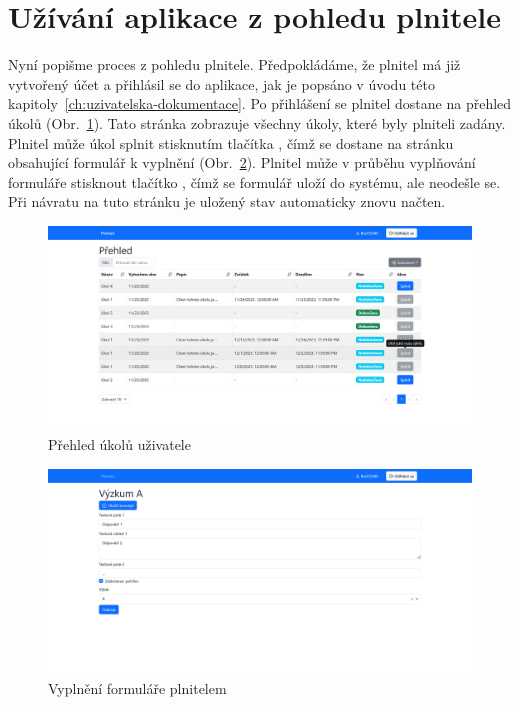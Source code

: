 \section{Užívání aplikace z pohledu plnitele}\label{sec:uzivani-aplikace-z-pohledu-plnitele}

Nyní popišme proces z pohledu plnitele.
Předpokládáme, že plnitel má již vytvořený účet a přihlásil se do aplikace, jak je popsáno v úvodu této kapitoly~\ref{ch:uzivatelska-dokumentace}.
Po přihlášení se plnitel dostane na přehled úkolů (Obr.\ \ref{fig:prehled-ukolu-uzivatel-screenshot}).
Tato stránka zobrazuje všechny úkoly, které byly plniteli zadány.
Plnitel může úkol splnit stisknutím tlačítka , čímž se dostane na stránku obsahující formulář k vyplnění (Obr.\ \ref{fig:vyplneni-formulare-uzivatel-screenshot}).
Plnitel může v průběhu vyplňování formuláře stisknout tlačítko , čímž se formulář uloží do systému, ale neodešle se.
Při návratu na tuto stránku je uložený stav automaticky znovu načten.

\begin{figure}[H]
    \includegraphics[width=\textwidth]{../img/screenshots/prehled-uzivatel}
    \caption{Přehled úkolů uživatele}\label{fig:prehled-ukolu-uzivatel-screenshot}
\end{figure}

\begin{figure}[H]
    \includegraphics[width=\textwidth]{../img/screenshots/vyplneni-formulare-uzivatel}
    \caption{Vyplnění formuláře plnitelem}\label{fig:vyplneni-formulare-uzivatel-screenshot}
\end{figure}

